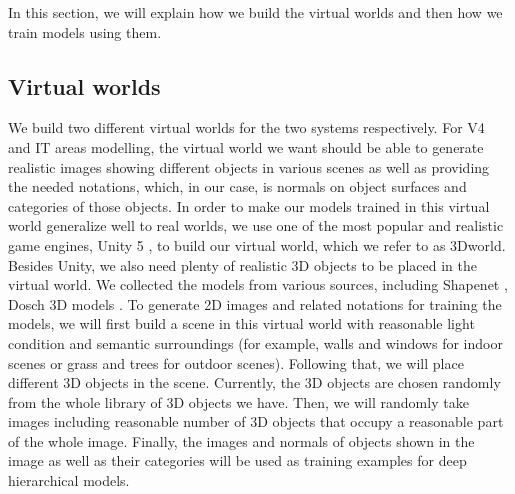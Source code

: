 \documentclass[12pt]{article}
\begin{document}
In this section, we will explain how we build the virtual worlds and then how we train models using them.

\subsection*{Virtual worlds}

We build two different virtual worlds for the two systems respectively. For V4 and IT areas modelling, the virtual world we want should be able to generate realistic images showing different objects in various scenes as well as providing the needed notations, which, in our case, is normals on object surfaces and categories of those objects.
In order to make our models trained in this virtual world generalize well to real worlds, we use one of the most popular and realistic game engines, Unity 5 \cite{unity}, to build our virtual world, which we refer to as 3Dworld.
Besides Unity, we also need plenty of realistic 3D objects to be placed in the virtual world. We collected the models from various sources, including Shapenet \cite{Chang2015}, Dosch 3D models \cite{dosch}. To generate 2D images and related notations for training the models, we will first build a scene in this virtual world with reasonable light condition and semantic surroundings (for example, walls and windows for indoor scenes or grass and trees for outdoor scenes).
Following that, we will place different 3D objects in the scene. Currently, the 3D objects are chosen randomly from the whole library of 3D objects we have. Then, we will randomly take images including reasonable number of 3D objects that occupy a reasonable part of the whole image. Finally, the images and normals of objects shown in the image as well as their categories will be used as training examples for deep hierarchical models.
\end{document}
